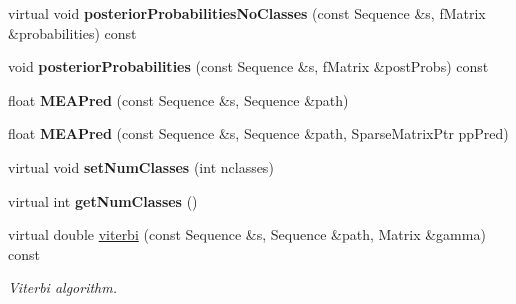 \begin{DoxyCompactItemize}
\item 
\mbox{\label{classtops_1_1GeneralizedHiddenMarkovModel_aba67124b630b7e629247eaa01342f9a1}} 
virtual void {\bfseries posterior\+Probabilities\+No\+Classes} (const Sequence \&s, f\+Matrix \&probabilities) const
\item 
\mbox{\label{classtops_1_1GeneralizedHiddenMarkovModel_adbaf1c508674368629dc13e1e9d24896}} 
void {\bfseries posterior\+Probabilities} (const Sequence \&s, f\+Matrix \&post\+Probs) const
\item 
\mbox{\label{classtops_1_1GeneralizedHiddenMarkovModel_a05f89824bf4b86e60389eb81bec11014}} 
float {\bfseries M\+E\+A\+Pred} (const Sequence \&s, Sequence \&path)
\item 
\mbox{\label{classtops_1_1GeneralizedHiddenMarkovModel_a9da68c98f3541c708e619617a71277b0}} 
float {\bfseries M\+E\+A\+Pred} (const Sequence \&s, Sequence \&path, Sparse\+Matrix\+Ptr pp\+Pred)
\item 
\mbox{\label{classtops_1_1GeneralizedHiddenMarkovModel_a3002226ce58a1a1add9473247a489e26}} 
virtual void {\bfseries set\+Num\+Classes} (int nclasses)
\item 
\mbox{\label{classtops_1_1GeneralizedHiddenMarkovModel_a3a2b7a4a58b562f79e323bb08d6466ff}} 
virtual int {\bfseries get\+Num\+Classes} ()
\item 
\mbox{\label{classtops_1_1GeneralizedHiddenMarkovModel_ab2c66b9df98c2a06afb2101c4eff9fe3}} 
virtual double \hyperlink{classtops_1_1GeneralizedHiddenMarkovModel_ab2c66b9df98c2a06afb2101c4eff9fe3}{viterbi} (const Sequence \&s, Sequence \&path, Matrix \&gamma) const
\begin{DoxyCompactList}\small\item\em Viterbi algorithm. \end{DoxyCompactList}\item 
\mbox{\label{classtops_1_1GeneralizedHiddenMarkovModel_abb20e8b6109fb2e677a84c14a4cd4b1b}} 

\end{DoxyCompactItemize}
